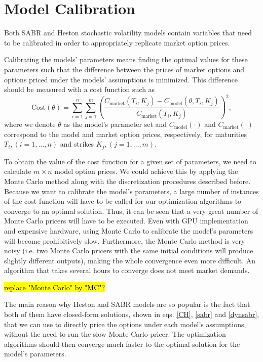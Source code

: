  
 
 
\section{Model Calibration}
\label{section:Model Calibration}
Both SABR and Heston stochastic volatility models contain variables that need to be calibrated in order to appropriately replicate market option prices.


Calibrating the models' parameters means finding the optimal values for these parameters such that the difference between the prices of market options and options priced under the models' assumptions is minimized. This difference should be measured with a cost function such as
\begin{equation}\label{cost}
\mathrm{Cost}(\theta)=\sum_{i=1}^n\sum_{j=1}^m\left(\frac{C_{\mathrm{market}}(T_i,K_j)-C_{\mathrm{model}}(\theta,T_i,K_j)}{C_{\mathrm{market}}(T_i,K_j)}\right)^2,
\end{equation}
\noindent where we denote $\theta$ as the model's parameter set and $C_{\mathrm{model}}(\cdot)$ and $C_{\mathrm{market}}(\cdot)$ correspond to the model and market option prices, respectively, for maturities $T_i,(i=1,\ldots,n)$ and strikes $K_j,(j=1,\ldots,m)$.

To obtain the value of the cost function for a given set of parameters, we need to calculate $m\times n$ model option prices. We could achieve this by applying the Monte Carlo method along with the discretization procedures described before.
Because we want to calibrate the model's parameters, a large number of instances of the cost function will have to be called for our optimization algorithms to converge to an optimal solution.
Thus, it can be seen that a very great number of Monte Carlo pricers will have to be executed. Even with GPU implementation and expensive hardware, using Monte Carlo to calibrate the model's parameters will become prohibitively slow. Furthermore, the Monte Carlo method is very noisy (i.e. two Monte Carlo pricers with the same initial conditions will produce slightly different outputs), making the whole convergence even more difficult.
An algorithm that takes several hours to converge does not meet market demands.

\hl{replace "Monte Carlo" by "MC"?}

The main reason why Heston and SABR models are so popular is the fact that both of them have closed-form solutions, shown in eqs. \eqref{CH}, \eqref{sabr} and \eqref{dynsabr}, that we can use to directly price the options under each model's assumptions, without the need to run the slow Monte Carlo pricer. The optimization algorithms should then converge much faster to the optimal solution for the model's parameters.






